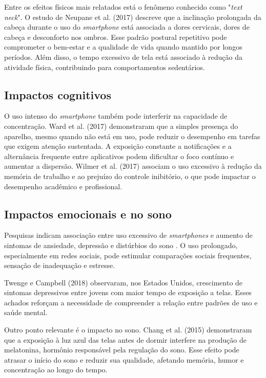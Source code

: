 Entre os efeitos físicos mais relatados está o fenômeno conhecido como "\textit{text neck}". O estudo de Neupane et al. (2017) descreve que a inclinação prolongada da cabeça durante o uso do \textit{smartphone} está associada a dores cervicais, dores de cabeça e desconforto nos ombros. Esse padrão postural repetitivo pode comprometer o bem-estar e a qualidade de vida quando mantido por longos períodos. Além disso, o tempo excessivo de tela está associado à redução da atividade física, contribuindo para comportamentos sedentários.

\subsection{Impactos cognitivos}

O uso intenso do \textit{smartphone} também pode interferir na capacidade de concentração. Ward et al. (2017) demonstraram que a simples presença do aparelho, mesmo quando não está em uso, pode reduzir o desempenho em tarefas que exigem atenção sustentada. A exposição constante a notificações e a alternância frequente entre aplicativos podem dificultar o foco contínuo e aumentar a dispersão. Wilmer et al. (2017) associam o uso excessivo à redução da memória de trabalho e ao prejuízo do controle inibitório, o que pode impactar o desempenho acadêmico e profissional.

\subsection{Impactos emocionais e no sono}

Pesquisas indicam associação entre uso excessivo de \textit{smartphones} e aumento de sintomas de ansiedade, depressão e distúrbios do sono \cite{twenge2018screentime}. O uso prolongado, especialmente em redes sociais, pode estimular comparações sociais frequentes, sensação de inadequação e estresse.

Twenge e Campbell (2018) observaram, nos Estados Unidos, crescimento de sintomas depressivos entre jovens com maior tempo de exposição a telas. Esses achados reforçam a necessidade de compreender a relação entre padrões de uso e saúde mental.

Outro ponto relevante é o impacto no sono. Chang et al. (2015) demonstraram que a exposição à luz azul das telas antes de dormir interfere na produção de melatonina, hormônio responsável pela regulação do sono. Esse efeito pode atrasar o início do sono e reduzir sua qualidade, afetando memória, humor e concentração ao longo do tempo.


